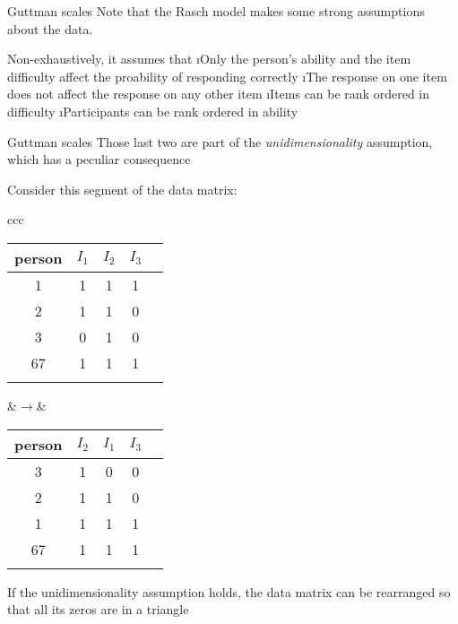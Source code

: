 \documentclass[aspectratio=169]{beamer}
\begin{document}
\begin{frame}[fragile]{Guttman scales}
Note that the Rasch model makes some strong assumptions about the data.\\[3ex]\pause

Non-exhaustively, it assumes that
\bi
\i Only the person's ability and the item difficulty affect the proability of responding correctly
\i The response on one item does not affect the response on any other item
\i Items can be rank ordered in difficulty
\i Participants can be rank ordered in ability
\ei

\end{frame}


\newcommand{\rd}[1]{{\color{red}#1}}

\begin{frame}[fragile]{Guttman scales}
Those last two are part of the \textit{unidimensionality} assumption, which has a peculiar consequence\\[1ex]\pause

Consider this segment of the data matrix:\\[3ex]

\centering\begin{tabular}{ccc}
\begin{tabular}{ccccc}\hline
person & $I_1$ & $I_2$ & $I_3$ \\\hline
    1  &     1  &     1  &     1    \\
    2  &     1  &     1  &     0    \\
    3  &     0  &     1  &     0   \\
   67  &     1  &     1  &     1   \\\hline\\
\end{tabular}&\pause$\rightarrow$&
\begin{tabular}{ccccc}\hline
person & $I_2$ & $I_1$ & $I_3$ \\\hline
    3  &     1  & \rd{0} & \rd{0}  \\
    2  &     1  &     1  & \rd{0}  \\
    1  &     1  &     1  &     1   \\
   67  &     1  &     1  &     1   \\\hline\\
\end{tabular}
\end{tabular}\flushleft

If the unidimensionality assumption holds, the data matrix can be rearranged so that all its zeros are in a triangle

\end{frame}
\end{document}
